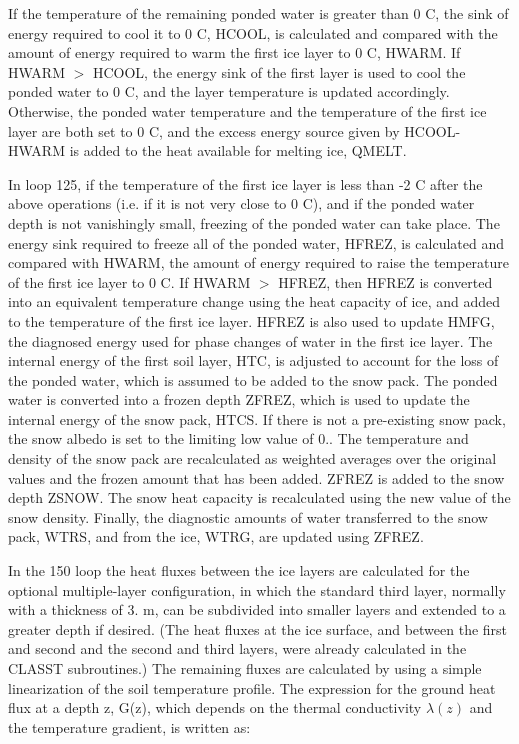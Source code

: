 If the temperature of the remaining ponded water is greater than 0 C, the sink of energy required to cool it to 0 C, H\+C\+O\+O\+L, is calculated and compared with the amount of energy required to warm the first ice layer to 0 C, H\+W\+A\+R\+M. If H\+W\+A\+R\+M $>$ H\+C\+O\+O\+L, the energy sink of the first layer is used to cool the ponded water to 0 C, and the layer temperature is updated accordingly. Otherwise, the ponded water temperature and the temperature of the first ice layer are both set to 0 C, and the excess energy source given by H\+C\+O\+O\+L-\/\+H\+W\+A\+R\+M is added to the heat available for melting ice, Q\+M\+E\+L\+T.

In loop 125, if the temperature of the first ice layer is less than -\/2 C after the above operations (i.\+e. if it is not very close to 0 C), and if the ponded water depth is not vanishingly small, freezing of the ponded water can take place. The energy sink required to freeze all of the ponded water, H\+F\+R\+E\+Z, is calculated and compared with H\+W\+A\+R\+M, the amount of energy required to raise the temperature of the first ice layer to 0 C. If H\+W\+A\+R\+M $>$ H\+F\+R\+E\+Z, then H\+F\+R\+E\+Z is converted into an equivalent temperature change using the heat capacity of ice, and added to the temperature of the first ice layer. H\+F\+R\+E\+Z is also used to update H\+M\+F\+G, the diagnosed energy used for phase changes of water in the first ice layer. The internal energy of the first soil layer, H\+T\+C, is adjusted to account for the loss of the ponded water, which is assumed to be added to the snow pack. The ponded water is converted into a frozen depth Z\+F\+R\+E\+Z, which is used to update the internal energy of the snow pack, H\+T\+C\+S. If there is not a pre-\/existing snow pack, the snow albedo is set to the limiting low value of 0.. The temperature and density of the snow pack are recalculated as weighted averages over the original values and the frozen amount that has been added. Z\+F\+R\+E\+Z is added to the snow depth Z\+S\+N\+O\+W. The snow heat capacity is recalculated using the new value of the snow density. Finally, the diagnostic amounts of water transferred to the snow pack, W\+T\+R\+S, and from the ice, W\+T\+R\+G, are updated using Z\+F\+R\+E\+Z.

In the 150 loop the heat fluxes between the ice layers are calculated for the optional multiple-\/layer configuration, in which the standard third layer, normally with a thickness of 3. m, can be subdivided into smaller layers and extended to a greater depth if desired. (The heat fluxes at the ice surface, and between the first and second and the second and third layers, were already calculated in the C\+L\+A\+S\+S\+T subroutines.) The remaining fluxes are calculated by using a simple linearization of the soil temperature profile. The expression for the ground heat flux at a depth z, G(z), which depends on the thermal conductivity $\lambda(z)$ and the temperature gradient, is written as\+:

